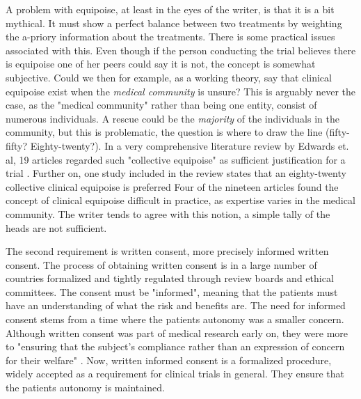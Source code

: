 \documentclass[12p]{article}
\begin{document}
A problem with equipoise, at least in the eyes of the writer, is that it is a bit mythical.
It must show a perfect balance between two treatments by weighting the a-priory information about the treatments.
There is some practical issues associated with this.
Even though if the person conducting the trial believes there is equipoise one of her peers could say it is not, the concept is somewhat subjective.
Could we then for example, as a working theory, say that clinical equipoise exist when the \emph{medical community} is unsure?
This is arguably never the case, as the "medical community" rather than being one entity, consist of numerous individuals.
A rescue could be the \emph{majority} of the individuals in the community, but this is problematic, the question is where to draw the line (fifty-fifty? Eighty-twenty?).
In a very comprehensive literature review by Edwards et. al, 19 articles regarded such "collective equipoise" as sufficient justification for a trial \cite{reviewarticle}.
Further on, one study included in the review states that an eighty-twenty collective clinical equipoise is preferred \cite{johnson}
Four of the nineteen articles found the concept of clinical equipoise difficult in practice, as expertise varies in the medical community.
The writer tends to agree with this notion, a simple tally of the heads are not sufficient.

The second requirement is written consent, more precisely informed written consent.
The process of obtaining written consent is in a large number of countries formalized and tightly regulated through review boards and ethical committees.
The consent must be "informed", meaning that the patients must have an understanding of what the risk and benefits are.
The need for informed consent stems from a time where the patients autonomy was a smaller concern.
Although written consent was part of medical research early on, they were more to "ensuring that the subject's compliance rather than an expression of concern for their welfare" \cite{nadineth}.
Now, written informed consent is a formalized procedure, widely accepted as a requirement for clinical trials in general.
They ensure that the patients autonomy is maintained.
\end{document}
